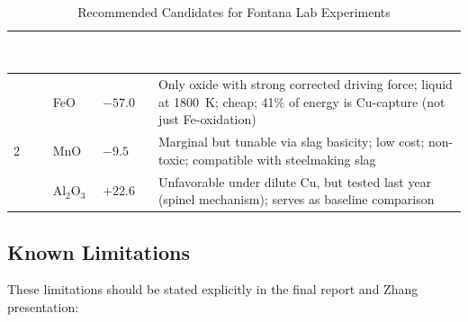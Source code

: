 \documentclass[11pt]{article}
\begin{document}
\begin{table}[H]
\caption{Recommended Candidates for Fontana Lab Experiments}
\label{tab:recommendations}
\centering
\renewcommand{\arraystretch}{1.3}
\setlength{\arrayrulewidth}{0.8pt}
\begin{tabular}{|>{\centering\arraybackslash}p{0.4in}|>{\raggedright\arraybackslash}p{1.3in}|>{\centering\arraybackslash}p{1.0in}|>{\raggedright\arraybackslash}p{2.5in}|}
\hline
\rowcolor{headercolor}
\textcolor{white}{\textbf{Tier}} & \textcolor{white}{\textbf{Oxide}} & \textcolor{white}{\textbf{$\Delta G_{\text{eff}}$ (kJ)}} & \textcolor{white}{\textbf{Rationale}} \\
\hline
1 & FeO & $-57.0$ & Only oxide with strong corrected driving force; liquid at \SI{1800}{\kelvin}; cheap; 41\% of energy is Cu-capture (not just Fe-oxidation) \\
\hline
\rowcolor{altrow}
2 & MnO & $-9.5$ & Marginal but tunable via slag basicity; low cost; non-toxic; compatible with steelmaking slag \\
\hline
3 & Al$_2$O$_3$ & $+22.6$ & Unfavorable under dilute Cu, but tested last year (spinel mechanism); serves as baseline comparison \\
\hline
\end{tabular}
\end{table}

\subsection{Known Limitations}

These limitations should be stated explicitly in the final report and Zhang presentation:
\end{document}
